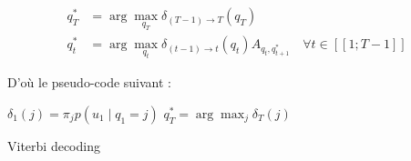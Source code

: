 \documentclass[12pt,a4paper,onecolumn]{article}
\begin{document}
\begin{align}
	q_T^* & = \operatorname{arg}\max_{q_T} \delta_{(T-1)\rightarrow T}(q_T)                                                      \\
	q_t^* & = \operatorname{arg}\max_{q_t} \delta_{(t-1)\rightarrow t}(q_t) A_{q_t, q_{t+1}^*} \quad \forall t \in [\![1;T-1]\!]
\end{align}

D'où le pseudo-code suivant :

\begin{algorithm}[H]
	\SetAlgoLined
	$\delta_1(j) = \pi_j p(u_1
		\mid q_1 = j)$\;
	$q_T^* = \operatorname{arg}\max_{j} \delta_T(j)$\;
	\caption{Viterbi decoding}
\end{algorithm}


\subsection{}
\end{document}
